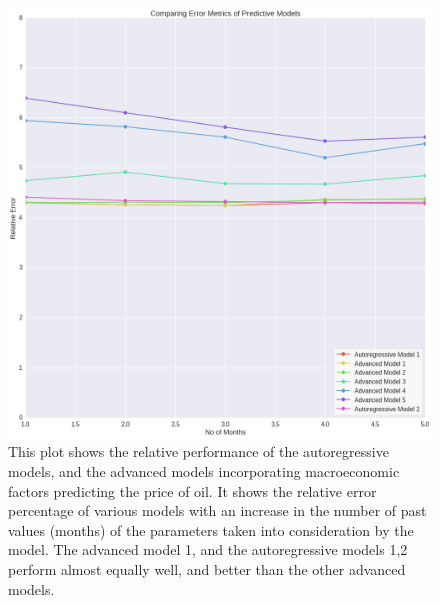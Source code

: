\documentclass[runningheads]{llncs}
\begin{document}
\begin{figure}
\centering
\includegraphics[width=\textwidth]{ModelComparison_Gold.png}
\caption{This plot shows the relative performance of the autoregressive models, and the advanced models incorporating macroeconomic factors predicting the price of oil. It shows the relative error percentage of various models with an increase in the number of past values (months) of the parameters taken into consideration by the model. The advanced model 1, and the autoregressive models 1,2 perform almost equally well, and better than the other advanced models. }
\label{fig:ModelComparison_Gold.png}
\end{figure}
\end{document}
